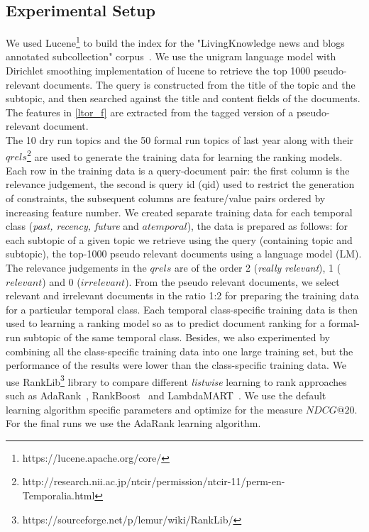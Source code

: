 \documentclass{sig-alternate}
\begin{document}
\subsection{Experimental Setup}
We used Lucene\footnote{https://lucene.apache.org/core/} to build the index for the "LivingKnowledge news and blogs annotated subcollection" corpus~\cite{mioverview}. We use the unigram language model with Dirichlet smoothing implementation of lucene to retrieve the top 1000 pseudo-relevant documents. The query is constructed from the title of the topic and the subtopic, and then searched against the title and content fields of the documents. The features in \ref{ltor_f} are extracted from the tagged version of a pseudo-relevant document.
\\
The 10 dry run topics and the 50 formal run topics of last year along with their $qrels$\footnote{http://research.nii.ac.jp/ntcir/permission/ntcir-11/perm-en-Temporalia.html} are used to generate the training data for learning the ranking models. Each row in the training data is a query-document pair: the first column is the relevance judgement, the second is query id (qid) used to restrict the generation of constraints, the subsequent columns are feature/value pairs ordered by increasing feature number. We created separate training data for each temporal class (\textit{past, recency, future} and $atemporal$), the data is prepared as follows: for each subtopic of a given topic we retrieve using the query (containing topic and subtopic), the top-1000 pseudo relevant documents using a language model (LM). The relevance judgements in the $qrels$ are of the order 2 (\textit{really relevant}), 1 ($relevant$) and 0 ($irrelevant$). From the pseudo relevant documents, we select relevant and irrelevant documents in the ratio 1:2 for preparing the training data for a particular temporal class. Each temporal class-specific training data is then used to learning a ranking model so as to predict document ranking for a formal-run subtopic of the same temporal class. Besides, we also experimented by combining all the class-specific training data into one large training set, but the performance of the results were lower than the class-specific training data. We use RankLib\footnote{https://sourceforge.net/p/lemur/wiki/RankLib/} library to compare different \textit{listwise} learning to rank approaches such as AdaRank~\cite{adarank}, RankBoost~\cite{rankboost} and LambdaMART~\cite{lambdamart}. We use the default learning algorithm specific parameters and optimize for the measure $NDCG@20$. For the final runs we use the AdaRank learning algorithm.
\end{document}
